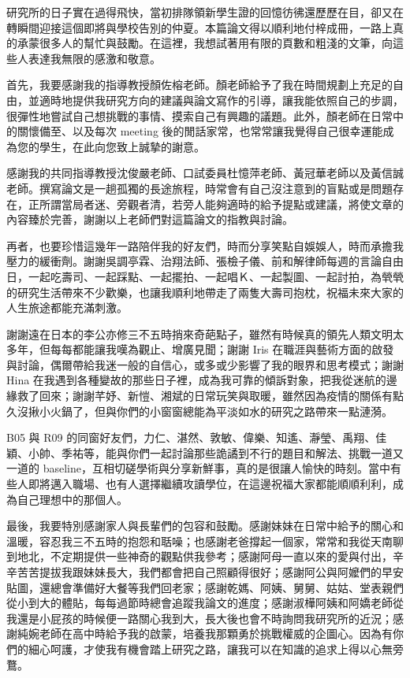 
\begin{acknowledgement}

研究所的日子實在過得飛快，當初排隊領新學生證的回憶彷彿還歷歷在目，卻又在轉瞬間迎接這個即將與學校告別的仲夏。本篇論文得以順利地付梓成冊，一路上真的承蒙很多人的幫忙與鼓勵。在這裡，我想試著用有限的頁數和粗淺的文筆，向這些人表達我無限的感激和敬意。

首先，我要感謝我的指導教授顏佐榕老師。顏老師給予了我在時間規劃上充足的自由，並適時地提供我研究方向的建議與論文寫作的引導，讓我能依照自己的步調，很彈性地嘗試自己想挑戰的事情、摸索自己有興趣的議題。此外，顏老師在日常中的關懷備至、以及每次 meeting 後的閒話家常，也常常讓我覺得自己很幸運能成為您的學生，在此向您致上誠摯的謝意。

感謝我的共同指導教授沈俊嚴老師、口試委員杜憶萍老師、黃冠華老師以及黃信誠老師。撰寫論文是一趟孤獨的長途旅程，時常會有自己沒注意到的盲點或是問題存在，正所謂當局者迷、旁觀者清，若旁人能夠適時的給予提點或建議，將使文章的內容臻於完善，謝謝以上老師們對這篇論文的指教與討論。

再者，也要珍惜這幾年一路陪伴我的好友們，時而分享笑點自娛娛人，時而承擔我壓力的緩衝劑。謝謝吳調亭霖、治翔法師、張檢子儀、前和解律師每週的言論自由日，一起吃壽司、一起踩點、一起擺拍、一起唱Ｋ、一起製圖、一起討拍，為煢煢的研究生活帶來不少歡樂，也讓我順利地帶走了兩隻大壽司抱枕，祝福未來大家的人生旅途都能充滿刺激。

謝謝遠在日本的李公亦修三不五時捎來奇葩點子，雖然有時候真的領先人類文明太多年，但每每都能讓我嘆為觀止、增廣見聞；謝謝 Iris 在職涯與藝術方面的啟發與討論，偶爾帶給我迷一般的自信心，或多或少影響了我的眼界和思考模式；謝謝 Hina 在我遇到各種變故的那些日子裡，成為我可靠的傾訴對象，把我從迷航的邊緣救了回來；謝謝芊妤、新愷、湘斌的日常玩笑與取暖，雖然因為疫情的關係有點久沒揪小火鍋了，但與你們的小窗窗總能為平淡如水的研究之路帶來一點漣漪。

B05 與 R09 的同窗好友們，力仁、湛然、敦敏、偉樂、知遙、瀞瑩、禹翔、佳穎、小帥、季祐等，能與你們一起討論那些詭譎到不行的題目和解法、挑戰一道又一道的 baseline，互相切磋學術與分享新鮮事，真的是很讓人愉快的時刻。當中有些人即將邁入職場、也有人選擇繼續攻讀學位，在這邊祝福大家都能順順利利，成為自己理想中的那個人。

最後，我要特別感謝家人與長輩們的包容和鼓勵。感謝妹妹在日常中給予的關心和溫暖，容忍我三不五時的抱怨和聒噪；也感謝老爸撐起一個家，常常和我從天南聊到地北，不定期提供一些神奇的觀點供我參考；感謝阿母一直以來的愛與付出，辛辛苦苦提拔我跟妹妹長大，我們都會把自己照顧得很好；感謝阿公與阿嬤們的早安貼圖，還總會準備好大餐等我們回老家；感謝乾媽、阿姨、舅舅、姑姑、堂表親們從小到大的體貼，每每過節時總會追蹤我論文的進度；感謝淑樺阿姨和阿嬌老師從我還是小屁孩的時候便一路關心我到大，長大後也會不時詢問我研究所的近況；感謝純婉老師在高中時給予我的啟蒙，培養我那顆勇於挑戰權威的企圖心。因為有你們的細心呵護，才使我有機會踏上研究之路，讓我可以在知識的追求上得以心無旁鶩。


\end{acknowledgement}
